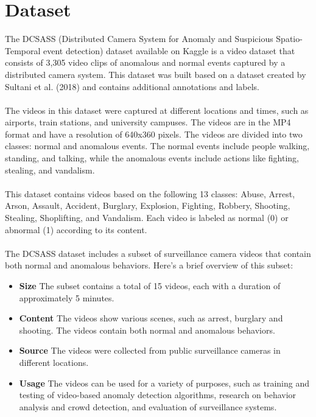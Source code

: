 \documentclass[title page]{article}
\begin{document}
\section{Dataset}

The DCSASS (Distributed Camera System for Anomaly and Suspicious Spatio-Temporal event detection) dataset available on Kaggle is a video dataset that consists of 3,305 video clips of anomalous and normal events captured by a distributed camera system. This dataset was built based on a dataset created by Sultani et al. (2018) and contains additional annotations and labels.
\\ \\ 
The videos in this dataset were captured at different locations and times, such as airports, train stations, and university campuses. The videos are in the MP4 format and have a resolution of 640x360 pixels. The videos are divided into two classes: normal and anomalous events. The normal events include people walking, standing, and talking, while the anomalous events include actions like fighting, stealing, and vandalism.
\\ \\
This dataset contains videos based on the following 13 classes: Abuse, Arrest, Arson, Assault, Accident, Burglary, Explosion, Fighting, Robbery, Shooting, Stealing, Shoplifting, and Vandalism. Each video is labeled as normal (0) or abnormal (1) according to its content.
\\ \\
The DCSASS dataset includes a subset of surveillance camera videos that contain both normal and anomalous behaviors. Here's a brief overview of this subset:

\begin{itemize}

    \item \textbf{Size} The subset contains a total of 15 videos, each with a duration of approximately 5 minutes.
    \item \textbf{Content} The videos show various scenes, such as arrest, burglary and shooting. The videos contain both normal and anomalous behaviors.
    \item \textbf{Source} The videos were collected from public surveillance cameras in different locations.
    \item \textbf{Usage} The videos can be used for a variety of purposes, such as training and testing of video-based anomaly detection algorithms, research on behavior analysis and crowd detection, and evaluation of surveillance systems.

\end{itemize}
	
\end{document}
